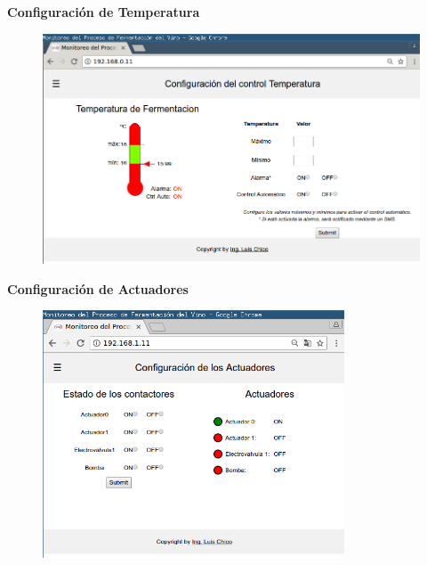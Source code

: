 \documentclass[11pt]{beamer}
\begin{document}
\begin{frame}{\textbf{\LARGE{Configuración de Temperatura}}}
  \vspace{-.7cm}
  \begin{figure}[H]
    {\includegraphics[width=1\textwidth]{./imagenes/config_temp.png}}
  \end{figure}	
\end{frame}

\begin{frame}{\textbf{\LARGE{Configuración de Actuadores}}}
  \vspace{-.6cm}
  \begin{figure}[H]
    {\includegraphics[width=0.8\textwidth]{./imagenes/config_act.png}}
  \end{figure}	
\end{frame}
\end{document}

